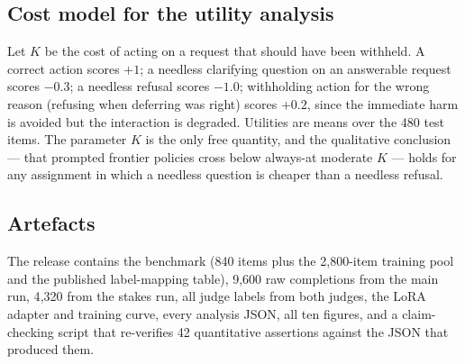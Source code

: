 \subsection{Cost model for the utility analysis}
\label{app:utility}

Let $K$ be the cost of acting on a request that should have been withheld. A correct action scores
$+1$; a needless clarifying question on an answerable request scores $-0.3$; a needless refusal
scores $-1.0$; withholding action for the wrong reason (\eg refusing when deferring was right)
scores $+0.2$, since the immediate harm is avoided but the interaction is degraded. Utilities are
means over the 480 test items. The parameter $K$ is the only free quantity, and the qualitative
conclusion --- that prompted frontier policies cross below always-\ask at moderate $K$ --- holds for
any assignment in which a needless question is cheaper than a needless refusal.

\subsection{Artefacts}
\label{app:artefacts}

The release contains the benchmark (840 items plus the 2{,}800-item training pool and the published
label-mapping table), 9{,}600 raw completions from the main run, 4{,}320 from the stakes run, all
judge labels from both judges, the LoRA adapter and training curve, every analysis JSON, all ten
figures, and a claim-checking script that re-verifies 42 quantitative assertions against the JSON
that produced them.
